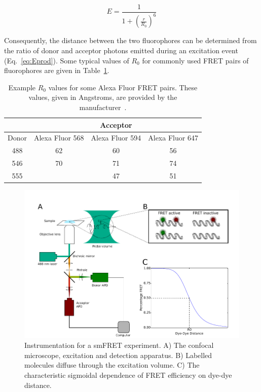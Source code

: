 \begin{equation}
E = \frac{1}{1 + (\frac{r}{R_0})^6} 
\label{eq:efficiency}
\end{equation}

Consequently, the distance between the two fluorophores can be determined from the ratio of donor and acceptor photons emitted during an excitation event (Eq.~\ref{eq:Eprod}). Some typical values of $R_0$ for commonly used FRET pairs of fluorophores are given in Table~\ref{tab:R0_examples}.


\begin{table}[!ht]
\caption{Example $R_0$ values for some Alexa Fluor FRET pairs. These values, given in Angstroms, are provided by the manufacturer~\cite{sigma_alexa}.}
\begin{tabular}{|c|ccc|}
\hline
 & & Acceptor & \\
\hline
Donor & Alexa Fluor 568 & Alexa Fluor 594 & Alexa Fluor 647 \\
\hline
488 & 62 & 60 & 56 \\
546 & 70 & 71 & 74 \\
555 & & 47 & 51 \\
\hline
\end{tabular}
\label{tab:R0_examples}
\end{table}

\begin{figure}[!ht]
   \begin{center}
      \includegraphics*[clip=true, width=6in]{pyFRET/Fig1_schematic.pdf}
      \caption{Instrumentation for a smFRET experiment. A) The confocal microscope, excitation and detection apparatus. B) Labelled molecules diffuse through the excitation volume. C) The characteristic sigmoidal dependence of FRET efficiency on dye-dye distance.}
      \label{fig:fig1_instrumentation}
   \end{center}
\end{figure}


